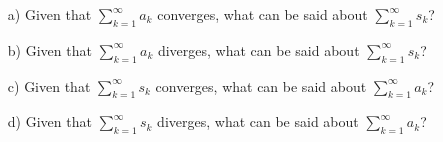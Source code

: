 \documentclass[12pt]{article}
\begin{document}
\begin{itemize}
\item[a)] Given that  $\sum^{\infty}_{k=1} a_k$ converges, what can be said about  $\sum^{\infty}_{k=1} s_k$?

\item[b)] Given that  $\sum^{\infty}_{k=1} a_k$ diverges, what can be said about  $\sum^{\infty}_{k=1} s_k$?

\item[c)] Given that  $\sum^{\infty}_{k=1} s_k$ converges, what can be said about  $\sum^{\infty}_{k=1} a_k$?

\item[d)] Given that  $\sum^{\infty}_{k=1} s_k$ diverges, what can be said about  $\sum^{\infty}_{k=1} a_k$?

\end{itemize}
\end{document}

